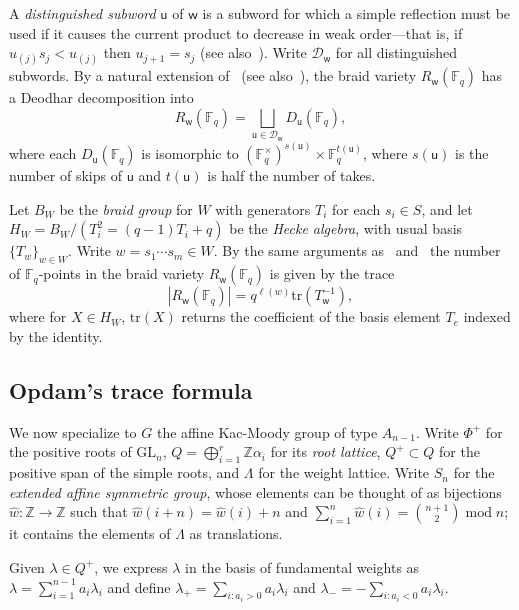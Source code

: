 \documentclass[a4paper,10pt,leqno]{amsart}
\newcommand{\darkred}{\color{darkred}}
\numberwithin{equation}{section}
\theoremstyle{definition}
\theoremstyle{remark}
\newcommand{\w}{\mathsf{w}}
\renewcommand{\u}{\mathsf{u}}
\newcommand{\F}{\textsc{fact}}
\renewcommand{\S}{\textsc{sub}}
\newcommand{\FF}{\mathbb{F}}
\newcommand{\hS}{\widehat{S}}
\newcommand{\hw}{\widehat{w}}
\newcommand{\tr}{\mathrm{tr}}
\newcommand{\rank}{r}
\newcommand{\GL}{\mathrm{GL}}
\renewcommand{\mod}{\;\mathrm{mod}\;}
\newcommand{\defn}[1]{\emph{\darkred #1}}
\begin{document}
A \defn{distinguished subword} $\u$ of $\w$ is a subword for which a simple reflection must be used if it causes the current product to decrease in weak order---that is, if $u_{(j)}s_j < u_{(j)}$ then $u_{j+1} = s_j$ (see also~).  Write $\mathcal{D}_{\w}$ for all distinguished subwords.  By a natural extension of~\cite{deodhar1985some} (see also~\cite{bao2021flag}), the braid variety $R_\w(\FF_q)$ has a Deodhar decomposition into 
\[R_{\w}(\FF_q) = \bigsqcup_{\u \in \mathcal{D}_{\w}} D_\u(\FF_q),\] where each $D_\u(\FF_q)$ is isomorphic to $(\FF_q^\times)^{s(\u)} \times \FF_q^{t(\u)} $, where $s(\u)$ is the number of skips of $\u$ and $t(\u)$ is half the number of takes.

Let $B_W$ be the \defn{braid group} for $W$ with generators $T_i$ for each $s_i \in S$, and let $H_W = B_W/(T_i^2=(q-1)T_i+q)$  be the \defn{Hecke algebra}, with usual basis $\{T_w\}_{w\in W}$.  Write $w=s_1\cdots s_m \in W$.  By the same arguments as~\cite[Lemmas A3 and A4]{kazhdan1979representations} and~\cite[Corollary 5.3]{galashin2022rational} the number of $\mathbb{F}_q$-points in the braid variety $R_{\w}(\FF_q)$ is given by the trace \[\left| R_{\w}(\FF_q)\right| = q^{\ell(w)} \tr( T_{\w}^{-1} ),\] where for $X \in H_W$, $\tr(X)$ returns the coefficient of the basis element $T_e$ indexed by the identity.

\subsection{Opdam's trace formula}
We now specialize to $G$ the affine Kac-Moody group of type $A_{n-1}$. Write $\Phi^+$ for the positive roots of $\mathrm{GL}_n$, $Q = \bigoplus_{i=1}^\rank \mathbb{Z} \alpha_i$ for its \emph{root lattice}, $Q^+ \subset Q$ for the positive span of the simple roots, and $\Lambda$ for the weight lattice.  Write $\widehat{S}_n$ for the \defn{extended affine symmetric group}, whose elements can be thought of as bijections $\hw: \mathbb{Z} \to \mathbb{Z}$ such that $\hw(i+n)=\hw(i)+n$ and $\sum_{i=1}^n \hw(i) = \binom{n+1}{2} \mod n$; it contains the elements of $\Lambda$ as translations.

Given $\lambda \in Q^+$, we express $\lambda$ in the basis of fundamental weights as $\lambda = \sum_{i=1}^{n-1} a_i \lambda_i$ and define $\lambda_+ = \sum_{i : a_i > 0} a_i \lambda_i$ and $\lambda_- = -\sum_{i : a_i < 0} a_i \lambda_i$.   %

\end{document}
